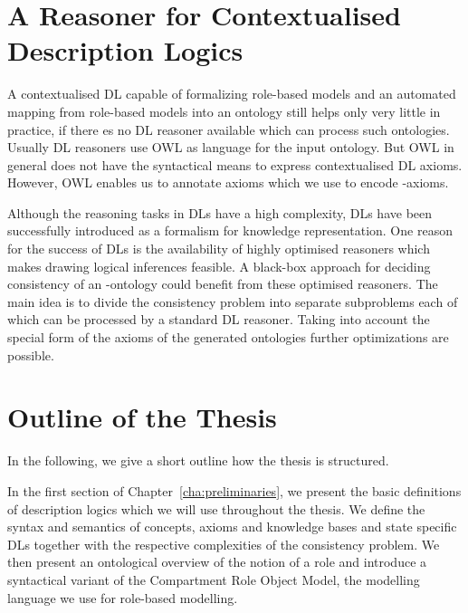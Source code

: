 \section{A Reasoner for Contextualised Description Logics}
\label{sec:intro-reasoner}

A contextualised DL capable of formalizing role-based models and an automated mapping from
role-based models into an ontology still helps only very little in practice, if there es no DL reasoner
available which can process such ontologies. 
%
Usually DL reasoners use OWL as language for the input ontology. But OWL in general does not
have the syntactical means to express contextualised DL axioms. However, OWL enables us to annotate
axioms which we use to encode \LMLO-axioms.

Although the reasoning tasks in DLs have a high complexity, DLs have been successfully introduced as
a formalism for knowledge representation. One reason for the success of DLs is the availability of
highly optimised reasoners which makes drawing logical inferences feasible. A black-box approach for
deciding consistency of an \LMLO-ontology could benefit from these optimised reasoners. The main
idea is to divide the consistency problem into separate subproblems each of which can be processed
by a standard DL reasoner.
%
Taking into account the special form of the axioms of the generated ontologies further optimizations
are possible.



\section{Outline of the Thesis}
\label{sec:outline-thesis}

In the following, we give a short outline how the thesis is structured.

In the first section of Chapter~\ref{cha:preliminaries}, we present the basic definitions of
description logics which we will use throughout the thesis. We define the syntax and semantics of
concepts, axioms and knowledge bases and state specific DLs together with the respective
complexities of the consistency problem.
%
We then present an ontological overview of the notion of a role and introduce
a syntactical variant of the Compartment Role Object Model, the modelling language we use for
role-based modelling.

